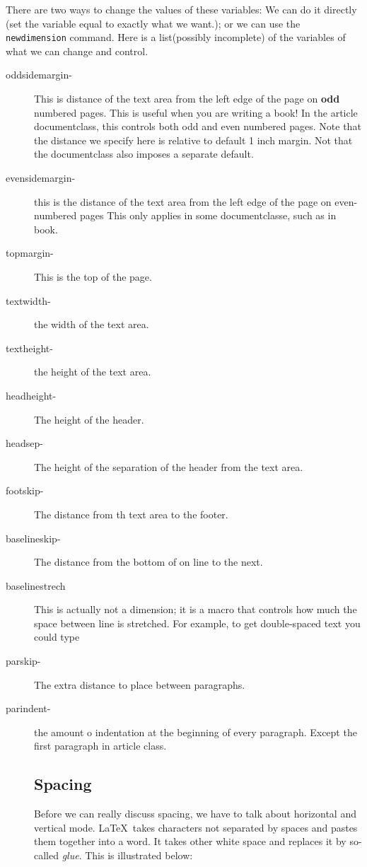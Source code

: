 \documentclass[12pt, leqno]{article}
\numberwithin{equation}{section}
\numberwithin{figure}{section}
\begin{document}
There are two ways to change the values of these variables: We can do it directly (set the variable equal to exactly what we want.); or we can use the \texttt{newdimension} command. 
Here is a list(possibly incomplete) of the variables of what we can change and control. 

\begin{description}
\item[oddsidemargin-]This is distance of the text area from the left edge of the page on \textbf{odd} numbered pages. 
This is useful when you are writing a book! In the article documentclass, this controls both odd and even numbered pages. Note that the distance we specify here is relative to default 1 inch margin. Not that the documentclass also imposes a separate default. 
\item[evensidemargin-]this is the distance of the text area from the left edge of the page on even-numbered pages This only applies in some documentclasse, such as in book. 
\item[topmargin-] This is the top of the page. 
\item[textwidth-]the width of the text area. 
\item[textheight-] the height of the text area. 
\item[headheight-] The height of the header. 
\item[headsep-]The height of the separation of the header from the text area. 
\item[footskip-] The distance from th text area to the footer. 
\item[baselineskip-] The distance from the bottom of on line to the next. 
\item[baselinestrech] This is actually not a dimension; it is a macro that controls how much the space between
line is stretched. For example, to get double-spaced text you could type\\
\item[parskip-] The extra distance to place between paragraphs. 
\item[parindent-] the amount o indentation at the beginning of every paragraph. Except the first paragraph in article class. 

\subsection{Spacing}

Before we can really discuss spacing, we have to talk about horizontal and vertical mode. \LaTeX\ 
takes characters not separated by spaces and pastes them together into a word. 
It takes other white space and replaces it by so-called \textit{glue}.
This is illustrated below: 


\end{description}
\end{document}

